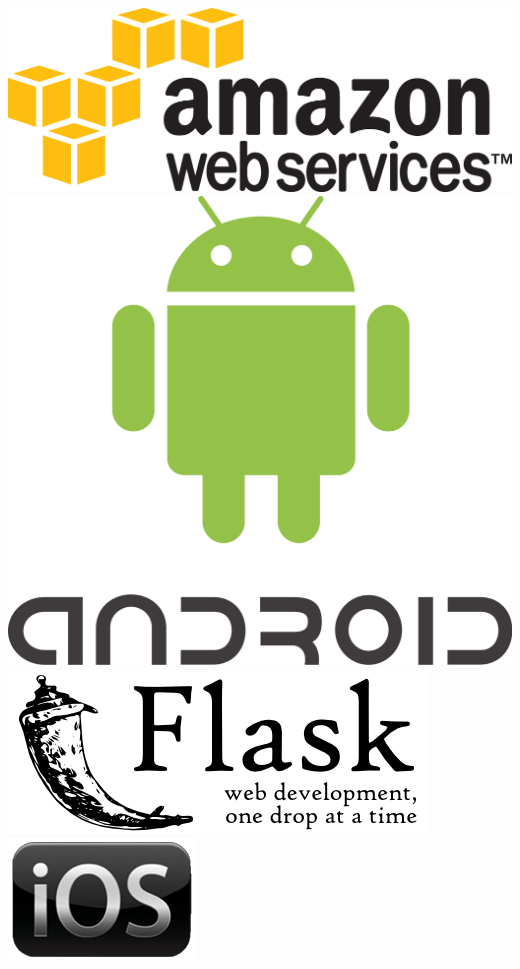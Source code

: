 \documentclass[landscape,a0paper,final,showframe]{baposter}
\begin{document}
\begin{poster}
{	\includegraphics[scale=0.45]{images/amazon-logo.png}
	\includegraphics[scale=0.045]{images/android-logo.png}
	\includegraphics[scale=0.35]{images/flask-logo.png}
	\includegraphics[scale=0.5]{images/ios-logo.png}
}
\end{poster}
\end{document}
